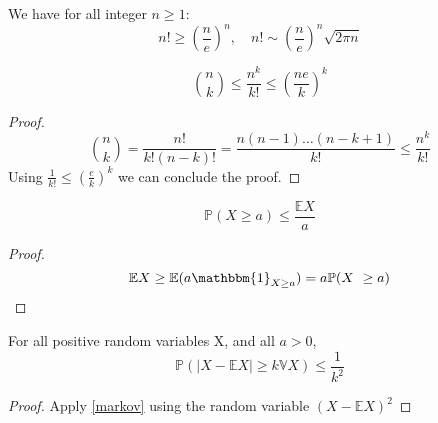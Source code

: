 \begin{theorem}\label{stirling} 
	We have for all integer $n\geq 1$:
	\begin{equation}
		n! \geq (\frac{n}{e})^n ,\quad	n! \sim (\frac{n}{e})^n \sqrt{2\pi n}
	\end{equation}
\end{theorem}

\begin{corollary}\label{th:NChooseK}
	\begin{equation}
		\binom{n}{k} \leq \frac{n^k}{k!} \leq (\frac{ne}{k})^k
	\end{equation}
\end{corollary}
\begin{proof}
	\begin{equation}
		\binom{n}{k} 	= \frac{n!}{k!(n-k)!} = \frac{n(n-1)\ldots(n-k+1)}{k!} \leq \frac{n^k}{k!}  
	\end{equation}
	Using $\frac{1}{k!} \leq (\frac{e}{k})^k$ we can conclude the proof.
\end{proof}
	\begin{theorem}\label{markov}
	\begin{equation}
		\mathbb{P}(X \geq a) \leq \frac{\mathbb{E}X}{a}
	\end{equation}
\end{theorem}
\begin{proof}
    \begin{equation}
	    \mathbb{E}X \geq \mathbb{E}(a\mathbbm{1}_{X\geq a} ) = a \mathbb{P}(X \geq a)
    \end{equation}
\end{proof}
\begin{corollary}\label{cheby} 
	For all positive random variables X, and all $a>0$,
	\begin{equation}
		\mathbb{P}(|X - \mathbb{E}X| \geq k \mathbb{V}X ) \leq \frac{1}{k^2}
	\end{equation}
\end{corollary}
\begin{proof}
    Apply \eqref{markov} using the random variable $(X-\mathbb{E}X)^2$
\end{proof}
